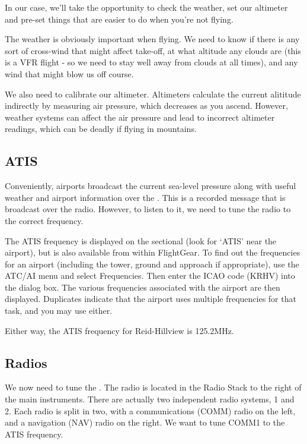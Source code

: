 In our case, we'll take the opportunity to check the weather, set our
altimeter and pre-set things that are easier to do when you're not flying.

The weather is obviously important when flying. We need to know if
there is any sort of cross-wind that might affect take-off, at what
altitude any clouds are (this is a VFR flight - so we need to stay
well away from clouds at all times), and any wind that might blow us off course.

We also need to calibrate our altimeter. Altimeters calculate the
current alititude indirectly by measuring air pressure, which decreases
as you ascend. However, weather systems can affect the air pressure and
lead to incorrect altimeter readings, which can be deadly if flying in mountains.

\subsection{ATIS}

Conveniently, airports broadcast the current sea-level pressure along
with useful weather and airport information over the .
This is a recorded message that is broadcast over the radio.
However, to listen to it, we need to tune the radio to the correct frequency.

The ATIS frequency is displayed on the sectional (look for `ATIS' near the airport), but is also
available from within FlightGear. To find out the frequencies for an
airport (including the tower, ground and approach if appropriate),
use the ATC/AI menu and select Frequencies. Then enter the ICAO code
(KRHV) into the dialog box. The various frequencies associated with the
airport are then displayed. Duplicates indicate that the airport uses
multiple frequencies for that task, and you may use either.

Either way, the ATIS frequency for Reid-Hillview is 125.2MHz.

\subsection{Radios}

We now need to tune the . The radio is located in the Radio
Stack to the right of the main instruments. There are actually two
independent radio systems, 1 and 2.  Each radio is split in two,
with a communications (COMM) radio on the left, and a navigation
(NAV) radio on the right. We want to tune COMM1 to the ATIS frequency.

